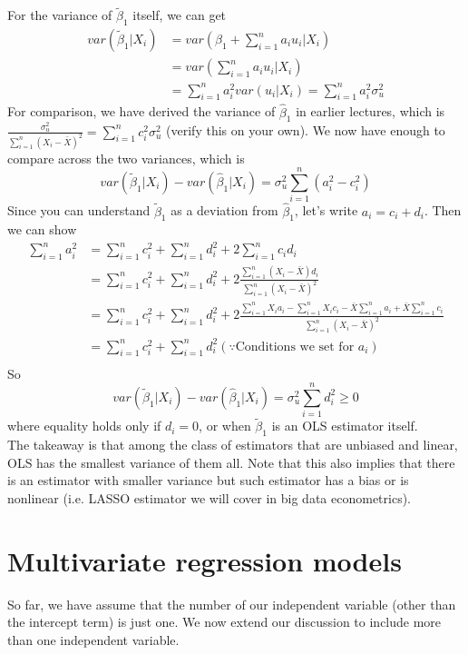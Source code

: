 \documentclass[12pt]{article}
\theoremstyle{definition}
\theoremstyle{property}
\theoremstyle{assumption}
\theoremstyle{example}
\theoremstyle{comment}
\begin{document}
For the variance of $\tilde{\beta}_1$ itself, we can get
\[
\begin{aligned}
var(\tilde{\beta}_1|X_i)&= var({\beta}_1+\sum_{i=1}^n a_iu_i|X_i)\\
 &=var(\sum_{i=1}^n a_iu_i|X_i)\\
  &=\sum_{i=1}^n a_i^2 var(u_i|X_i) = \sum_{i=1}^n a_i^2 \sigma_u^2
\end{aligned}
\]
For comparison, we have derived the variance of $\hat{\beta}_1$ in earlier lectures, which is $\frac{\sigma_u^2}{\sum_{i=1}^n(X_i-\bar{X})^2 }=\sum_{i=1}^n c_i^2\sigma_u^2$ (verify this on your own). We now have enough to compare across the two variances, which is
\[
var(\tilde{\beta}_1|X_i)-var(\hat{\beta}_1|X_i) = \sigma_u^2\sum_{i=1}^n (a_i^2-c_i^2)
\] 
Since you can understand $\tilde{\beta}_1$ as a deviation from $\hat{\beta}_1$, let's write $a_i = c_i+d_i$. Then we can show
\[
\begin{aligned}
\sum_{i=1}^n a_i^2&= \sum_{i=1}^n c_i^2+\sum_{i=1}^n d_i^2+2\sum_{i=1}^nc_id_i\\
&=\sum_{i=1}^n c_i^2+\sum_{i=1}^n d_i^2 + 2 \frac{\sum_{i=1}^n (X_i-\bar{X})d_i}{\sum_{i=1}^n(X_i-\bar{X})^2} \\
&=\sum_{i=1}^n c_i^2+\sum_{i=1}^n d_i^2 + 2 \frac{\sum_{i=1}^n X_ia_i-\sum_{i=1}^nX_ic_i-\bar{X}\sum_{i=1}^na_i+\bar{X}\sum_{i=1}^nc_i}{\sum_{i=1}^n(X_i-\bar{X})^2}\\
&=\sum_{i=1}^n c_i^2+\sum_{i=1}^n d_i^2 (\because\text{Conditions we set for $a_i$})\\
\end{aligned}
\]
So 
\[
var(\tilde{\beta}_1|X_i)-var(\hat{\beta}_1|X_i) = \sigma_u^2\sum_{i=1}^n d_i^2\geq0
\] 
where equality holds only if $d_i=0$, or when $\tilde{\beta}_1$ is an OLS estimator itself. \\

The takeaway is that among the class of estimators that are unbiased and linear, OLS has the smallest variance of them all. Note that this also implies that there is an estimator with smaller variance but such estimator has a bias or is nonlinear (i.e. LASSO estimator we will cover in big data econometrics).  
\section{Multivariate regression models}
So far, we have assume that the number of our independent variable (other than the intercept term) is just one. We now extend our discussion to include more than one independent variable. 
\end{document}
